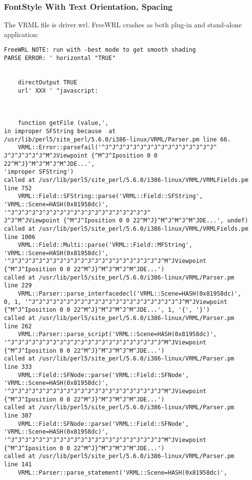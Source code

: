 \documentclass[12pt,letterpaper]{article}
\newcommand{\FSG}{FontStyle With Text Orientation, Spacing}
\begin{document}
\subsubsection{\FSG}
The VRML file is driver.wrl.\newline
FreeWRL crashes as both plug-in and stand-alone application:
\begin{verbatim}
FreeWRL NOTE: run with -best mode to get smooth shading
PARSE ERROR: ' horizontal "TRUE"


	directOutput TRUE
	url' XXX ' "javascript:



	function getFile (value,',
in improper SFString because  at
/usr/lib/perl5/site_perl/5.6.0/i386-linux/VRML/Parser.pm line 66.
	VRML::Error::parsefail('^J^J^J^J^J^J^J^J^J^J^J^J^J^J^J^J^
J^J^J^J^J^J^M^JViewpoint {^M^J^Iposition 0 0 22^M^J}^M^J^M^J^M^JDE...',
'improper SFString')
called at /usr/lib/perl5/site_perl/5.6.0/i386-linux/VRML/VRMLFields.pm
line 752
	VRML::Field::SFString::parse('VRML::Field::SFString',
'VRML::Scene=HASH(0x81958dc)', '^J^J^J^J^J^J^J^J^J^J^J^J^J^J^J^J^J^J^J^J^
J^J^M^JViewpoint {^M^J^Iposition 0 0 22^M^J}^M^J^M^J^M^JDE...', undef)
called at /usr/lib/perl5/site_perl/5.6.0/i386-linux/VRML/VRMLFields.pm
line 1006
	VRML::Field::Multi::parse('VRML::Field::MFString',
'VRML::Scene=HASH(0x81958dc)',
'^J^J^J^J^J^J^J^J^J^J^J^J^J^J^J^J^J^J^J^J^J^J^M^JViewpoint
{^M^J^Iposition 0 0 22^M^J}^M^J^M^J^M^JDE...')
called at /usr/lib/perl5/site_perl/5.6.0/i386-linux/VRML/Parser.pm
line 229
	VRML::Parser::parse_interfacedecl('VRML::Scene=HASH(0x81958dc)',
0, 1, '^J^J^J^J^J^J^J^J^J^J^J^J^J^J^J^J^J^J^J^J^J^J^M^JViewpoint
{^M^J^Iposition 0 0 22^M^J}^M^J^M^J^M^JDE...', 1, '{', '}')
called at /usr/lib/perl5/site_perl/5.6.0/i386-linux/VRML/Parser.pm
line 262
	VRML::Parser::parse_script('VRML::Scene=HASH(0x81958dc)',
'^J^J^J^J^J^J^J^J^J^J^J^J^J^J^J^J^J^J^J^J^J^J^M^JViewpoint
{^M^J^Iposition 0 0 22^M^J}^M^J^M^J^M^JDE...')
called at /usr/lib/perl5/site_perl/5.6.0/i386-linux/VRML/Parser.pm
line 333
	VRML::Field::SFNode::parse('VRML::Field::SFNode',
'VRML::Scene=HASH(0x81958dc)',
'^J^J^J^J^J^J^J^J^J^J^J^J^J^J^J^J^J^J^J^J^J^J^M^JViewpoint
{^M^J^Iposition 0 0 22^M^J}^M^J^M^J^M^JDE...')
called at /usr/lib/perl5/site_perl/5.6.0/i386-linux/VRML/Parser.pm
line 307
	VRML::Field::SFNode::parse('VRML::Field::SFNode',
'VRML::Scene=HASH(0x81958dc)',
'^J^J^J^J^J^J^J^J^J^J^J^J^J^J^J^J^J^J^J^J^J^J^M^JViewpoint
{^M^J^Iposition 0 0 22^M^J}^M^J^M^J^M^JDE...')
called at /usr/lib/perl5/site_perl/5.6.0/i386-linux/VRML/Parser.pm
line 141
	VRML::Parser::parse_statement('VRML::Scene=HASH(0x81958dc)',

\end{verbatim}
\end{document}

